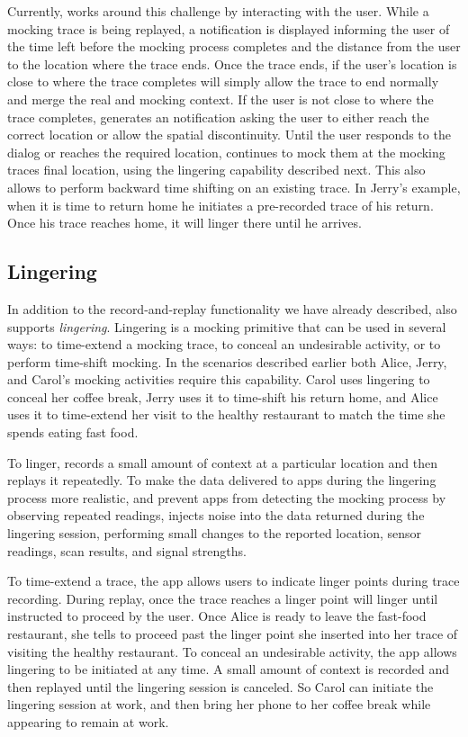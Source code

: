 Currently, \PocketMocker{} works around this challenge by interacting with
the user. While a mocking trace is being replayed, a notification is
displayed informing the user of the time left before the mocking process
completes and the distance from the user to the location where the trace
ends. Once the trace ends, if the user's location is close to where the trace
completes \PocketMocker{} will simply allow the trace to end normally and
merge the real and mocking context. If the user is not close to where the
trace completes, \PocketMocker{} generates an notification asking the user to
either reach the correct location or allow the spatial discontinuity. Until
the user responds to the dialog or reaches the required location,
\PocketMocker{} continues to mock them at the mocking traces final location,
using the lingering capability described next. This also allows
\PocketMocker{} to perform backward time shifting on an existing trace. In
Jerry's example, when it is time to return home he initiates a pre-recorded
trace of his return. Once his trace reaches home, it will linger there until
he arrives.

\subsection{Lingering}

In addition to the record-and-replay functionality we have already described,
\PocketMocker{} also supports \textit{lingering}. Lingering is a mocking
primitive that can be used in several ways: to time-extend a mocking trace,
to conceal an undesirable activity, or to perform time-shift mocking. In the
scenarios described earlier both Alice, Jerry, and Carol's mocking activities
require this capability. Carol uses lingering to conceal her coffee break,
Jerry uses it to time-shift his return home, and Alice uses it to time-extend
her visit to the healthy restaurant to match the time she spends eating fast
food.

To linger, \PocketMocker{} records a small amount of context at a particular
location and then replays it repeatedly. To make the data delivered to apps
during the lingering process more realistic, and prevent apps from detecting
the mocking process by observing repeated readings, \PocketMocker{} injects
noise into the data returned during the lingering session, performing small
changes to the reported location, sensor readings, scan results, and signal
strengths.

To time-extend a trace, the app allows users to indicate linger points during
trace recording. During replay, once the trace reaches a linger point
\PocketMocker{} will linger until instructed to proceed by the user. Once
Alice is ready to leave the fast-food restaurant, she tells \PocketMocker{}
to proceed past the linger point she inserted into her trace of visiting the
healthy restaurant. To conceal an undesirable activity, the \PocketMocker{}
app allows lingering to be initiated at any time. A small amount of context
is recorded and then replayed until the lingering session is canceled. So
Carol can initiate the lingering session at work, and then bring her phone to
her coffee break while appearing to remain at work.

